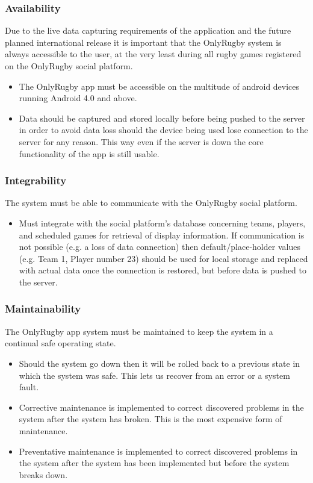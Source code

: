 \documentclass[hidelinks,a4paper,12pt]{article}
\begin{document}
	\subsubsection*{Availability}
	Due to the live data capturing requirements of the application and the future planned international release it is important that the OnlyRugby system is always accessible to the user, at the very least during all rugby games registered on the OnlyRugby social platform.
	\begin{itemize}
		\item The OnlyRugby app must be accessible on the multitude of android devices running Android 4.0 and above.
		\item Data should be captured and stored locally before being pushed to the server in order to avoid data loss should the device being used lose connection to the server for any reason. This way even if the server is down the core functionality of the app is still usable.
	\end{itemize}

	\subsubsection*{Integrability}
	The system must be able to communicate with the OnlyRugby social platform.
	\begin{itemize}
		\item Must integrate with the social platform's database concerning teams, players, and scheduled games for retrieval of display information. If communication is not possible (e.g. a loss of data connection) then default/place-holder values (e.g. Team 1, Player number 23) should be used for local storage and replaced with actual data once the connection is restored, but before data is pushed to the server.
	\end{itemize}
	\subsubsection*{Maintainability}
	The OnlyRugby app system must be maintained to keep the system in a continual safe operating state.
	\begin{itemize}
		\item Should the system go down then it will be rolled back to a previous state in which the system was safe. This lets us recover from an error or a system fault.
		\item Corrective maintenance is implemented to correct discovered problems in the system after the system has broken. This is the most expensive form of maintenance.
		\item Preventative maintenance is implemented to correct discovered problems in the system after the system has been implemented but before the system breaks down.
	\end{itemize}
	
\end{document}
